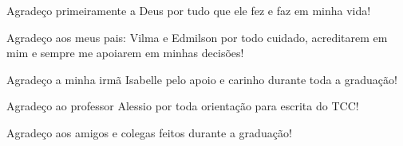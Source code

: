 \begin{agradecimentos}

Agradeço primeiramente a Deus por tudo que ele fez e faz em minha vida!

Agradeço aos meus pais: Vilma e Edmilson por todo cuidado, acreditarem em mim e sempre me apoiarem em minhas decisões!

Agradeço a minha irmã Isabelle pelo apoio e carinho durante toda a graduação!

Agradeço ao professor Alessio por toda orientação para escrita do TCC!

Agradeço aos amigos e colegas feitos durante a graduação!
\end{agradecimentos}